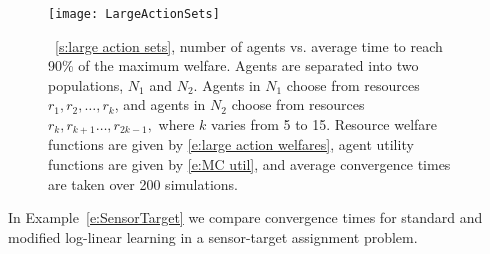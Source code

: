 \begin{example}
\begin{figure}[ht]
  \centering
    \texttt{[image: LargeActionSets]}
  \caption{ ~\ref{s:large action sets}, number of agents vs. average time to reach 90\% of the maximum welfare. Agents are separated into two populations, $N_1$ and $N_2.$ Agents in $N_1$ choose from resources $r_1, r_2,\ldots,r_k$, and agents in $N_2$ choose from resources $r_k, r_{k+1}\ldots,r_{2k-1},$ where $k$ varies from 5 to 15. Resource welfare functions are given by \eqref{e:large action welfares}, agent utility functions are given by \eqref{e:MC util}, and average convergence times are taken over 200 simulations. \label{f:LargeActionSets}}
\end{figure}

\end{example}





In Example~\ref{e:SensorTarget} we compare convergence times for standard and modified log-linear learning in a sensor-target assignment problem.



